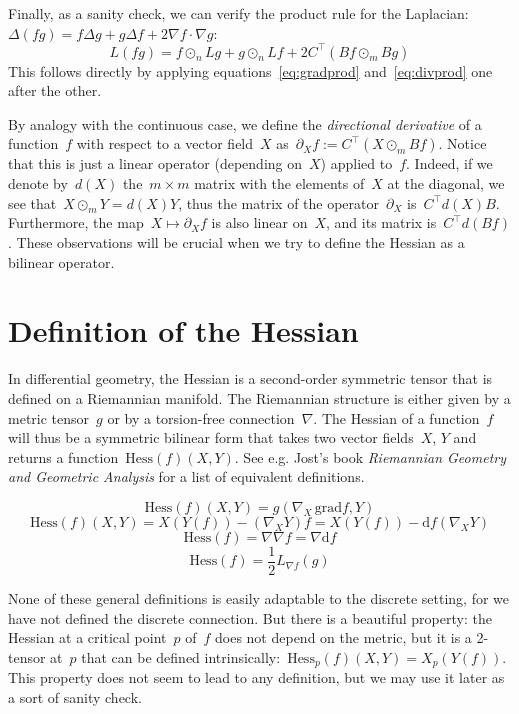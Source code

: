 Finally, as a sanity check, we can verify the
product rule for the Laplacian:~$\Delta\left(fg\right)=f\Delta g+g\Delta
f+2\nabla f\cdot\nabla g$:
\[
	L\left(fg\right)=
	f\odot_n Lg
	+
	g\odot_n Lf
	+2C^\top\left(Bf\odot_m Bg\right)
\]
This follows directly by applying equations~\eqref{eq:gradprod}
and~\eqref{eq:divprod} one after the other.

By analogy with the continuous case, we define the \emph{directional
derivative} of a function~$f$ with respect to a vector field~$X$
as~$\partial_Xf:=C^\top\left(X\odot_m Bf\right)$.  Notice that this is just a
linear operator (depending on~$X$) applied to~$f$.  Indeed, if we denote
by~$d(X)$ the~$m\times m$ matrix with the elements of~$X$ at the diagonal, we
see that~$X\odot_m Y=d(X)Y$, thus the matrix of the operator~$\partial_X$
is~$C^\top d(X)B$.  Furthermore, the map~$X\mapsto\partial_Xf$ is also linear
on~$X$, and its matrix is~$C^\top d\left(Bf\right)$.  These observations will
be crucial when we try to define the Hessian as a bilinear operator.


\section{Definition of the Hessian}

In differential geometry, the Hessian is a second-order symmetric tensor that
is defined on a Riemannian manifold.  The Riemannian structure is either
given by a metric tensor~$g$ or by a torsion-free connection~$\nabla$.  The
Hessian of a function~$f$ will thus be a symmetric bilinear form that takes
two vector fields~$X$, $Y$ and returns a
function~$\mathrm{Hess}\left(f\right)\left(X,Y\right)$.  See e.g. Jost's book
\emph{Riemannian Geometry and Geometric Analysis} for a list of equivalent
definitions.

\[
	\mathrm{Hess}\left(f\right)\left(X,Y\right)
	=
	g\left(\nabla_X\,\mathrm{grad}f,Y\right)
\]
\[
	\mathrm{Hess}\left(f\right)\left(X,Y\right)
	=
	X\left(Y\left(f\right)\right)-\left(\nabla_X Y\right)f
	=
	X\left(Y\left(f\right)\right)-\mathrm{d}f\left(\nabla_X Y\right)
\]
\[
	\mathrm{Hess}\left(f\right)
	=
	\nabla\nabla f
	=\nabla \mathrm{d} f
\]
\[
	\mathrm{Hess}\left(f\right)
	=
	\frac12L_{\nabla f} \left(g\right)
\]

None of these general definitions is easily adaptable to the discrete
setting, for we have not defined the discrete connection.  But there is a
beautiful property: the Hessian at a critical point~$p$ of~$f$ does not depend
on the metric, but it is a 2-tensor at~$p$ that can be defined
intrinsically:~$\mathrm{Hess}_p\left(f\right)(X,Y)=
X_p\left(Y\left(f\right)\right)$.  This property does not seem to lead to
any definition, but we may use it later as a sort of sanity check.

